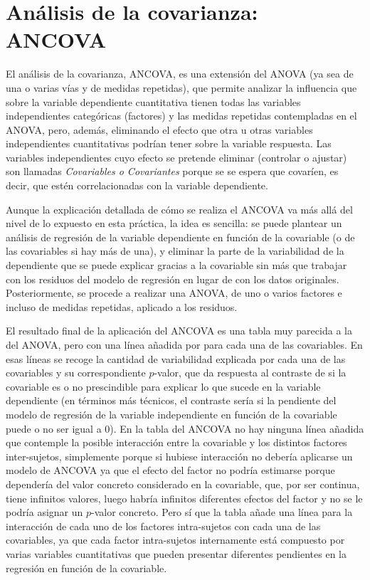 \documentclass[
  spanish,
  a4paper,
]{scrreport}
\theoremstyle{plain}
\theoremstyle{definition}
\theoremstyle{definition}
\theoremstyle{remark}
\begin{document}
\section{Análisis de la covarianza:
ANCOVA}\label{anuxe1lisis-de-la-covarianza-ancova}

El análisis de la covarianza, ANCOVA, es una extensión del ANOVA (ya sea
de una o varias vías y de medidas repetidas), que permite analizar la
influencia que sobre la variable dependiente cuantitativa tienen todas
las variables independientes categóricas (factores) y las medidas
repetidas contempladas en el ANOVA, pero, además, eliminando el efecto
que otra u otras variables independientes cuantitativas podrían tener
sobre la variable respuesta. Las variables independientes cuyo efecto se
pretende eliminar (controlar o ajustar) son llamadas \emph{Covariables o
Covariantes} porque se se espera que covaríen, es decir, que estén
correlacionadas con la variable dependiente.

Aunque la explicación detallada de cómo se realiza el ANCOVA va más allá
del nivel de lo expuesto en esta práctica, la idea es sencilla: se puede
plantear un análisis de regresión de la variable dependiente en función
de la covariable (o de las covariables si hay más de una), y eliminar la
parte de la variabilidad de la dependiente que se puede explicar gracias
a la covariable sin más que trabajar con los residuos del modelo de
regresión en lugar de con los datos originales. Posteriormente, se
procede a realizar una ANOVA, de uno o varios factores e incluso de
medidas repetidas, aplicado a los residuos.

El resultado final de la aplicación del ANCOVA es una tabla muy parecida
a la del ANOVA, pero con una línea añadida por para cada una de las
covariables. En esas líneas se recoge la cantidad de variabilidad
explicada por cada una de las covariables y su correspondiente
\(p\)-valor, que da respuesta al contraste de si la covariable es o no
prescindible para explicar lo que sucede en la variable dependiente (en
términos más técnicos, el contraste sería si la pendiente del modelo de
regresión de la variable independiente en función de la covariable puede
o no ser igual a 0). En la tabla del ANCOVA no hay ninguna línea añadida
que contemple la posible interacción entre la covariable y los distintos
factores inter-sujetos, simplemente porque si hubiese interacción no
debería aplicarse un modelo de ANCOVA ya que el efecto del factor no
podría estimarse porque dependería del valor concreto considerado en la
covariable, que, por ser continua, tiene infinitos valores, luego habría
infinitos diferentes efectos del factor y no se le podría asignar un
\(p\)-valor concreto. Pero sí que la tabla añade una línea para la
interacción de cada uno de los factores intra-sujetos con cada una de
las covariables, ya que cada factor intra-sujetos internamente está
compuesto por varias variables cuantitativas que pueden presentar
diferentes pendientes en la regresión en función de la covariable.
\end{document}
